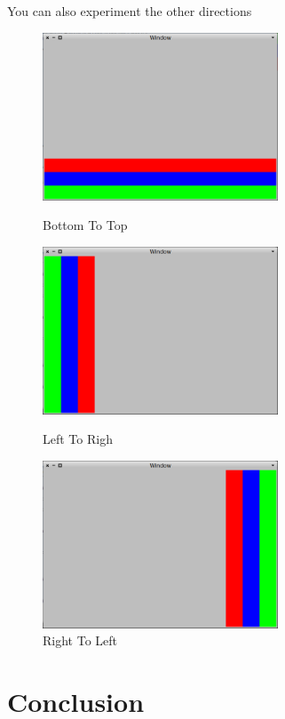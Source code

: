\documentclass[a4paper,10pt,twoside]{book}
\begin{document}
You can also experiment the other directions

\begin{figure}[ht]\centering
	\includegraphics[width=7cm]{TableLayout3}
	\caption{Bottom To Top}
	\label{fig:tableLayout3}
	\includegraphics[width=7cm]{TableLayout4}
	\caption{Left To Righ}
	\label{fig:tableLayout4}
	\includegraphics[width=7cm]{TableLayout5}
	\caption{Right To Left}
	\label{fig:tableLayout5}
\end{figure}


\section{Conclusion}

\ifx\wholebook\relax\else
   
   
\end{document}
